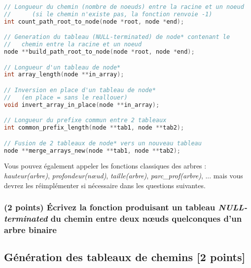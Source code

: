 \documentclass[11pt,a4paper]{article}
\begin{document}
\begin{center}
\begin{lstlisting}[language=C,commentstyle=\color{teal}\ttfamily,morekeywords={node}]
// Longueur du chemin (nombre de noeuds) entre la racine et un noeud
//      (si le chemin n'existe pas, la fonction renvoie -1)
int count_path_root_to_node(node *root, node *end);

// Generation du tableau (NULL-terminated) de node* contenant le
//   chemin entre la racine et un noeud
node **build_path_root_to_node(node *root, node *end);

// Longueur d'un tableau de node*
int array_length(node **in_array);

// Inversion en place d'un tableau de node*
//   (en place = sans le reallouer)
void invert_array_in_place(node **in_array);

// Longueur du prefixe commun entre 2 tableaux
int common_prefix_length(node **tab1, node **tab2);

// Fusion de 2 tableaux de node* vers un nouveau tableau
node **merge_arrays_new(node **tab1, node **tab2);
\end{lstlisting}
\end{center}


\noindent Vous pouvez également appeler les fonctions classiques des arbres : \textit{hauteur(arbre)}, \textit{profondeur(nœud)}, \textit{taille(arbre)}, \textit{parc\_prof(arbre)}, ... mais vous devrez les réimplémenter si nécessaire dans les questions suivantes.


\clearpage


\subsubsection{(2 points) \'Ecrivez la fonction produisant un tableau \textit{NULL-terminated} du chemin entre deux nœuds quelconques d'un arbre binaire}


\begin{center}
\end{center}


\clearpage


\subsection{Génération des tableaux de chemins [2 points]}
\end{document}
